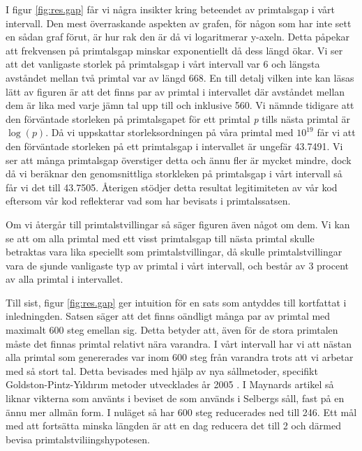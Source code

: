 I figur \ref{fig:res.gap} får vi några insikter kring beteendet av primtalsgap i vårt intervall. 
Den mest överraskande aspekten av grafen, för någon som har inte sett en sådan graf förut, är hur rak den är då vi logaritmerar y-axeln.
Detta påpekar att frekvensen på primtalsgap minskar exponentiellt då dess längd ökar. 
Vi ser att det vanligaste storlek på primtalsgap i vårt intervall var 6 och längsta avståndet mellan två primtal var av längd 668.
En till detalj vilken inte kan läsas lätt av figuren är att det finns par av primtal i intervallet där avståndet mellan dem är lika med varje jämn tal upp till och inklusive 560.
Vi nämnde tidigare att den förväntade storleken på primtalsgapet för ett primtal \textit{p} tills nästa primtal är \(\log(p)\). 
Då vi uppskattar storleksordningen på våra primtal med \(10^{19}\) får vi att den förväntade storleken på ett primtalsgap i intervallet är ungefär 43.7491.
Vi ser att många primtalsgap överstiger detta och ännu fler är mycket mindre, dock då vi beräknar den genomsnittliga storkleken på primtalsgap i vårt intervall så får vi det till 43.7505.
Återigen stödjer detta resultat legitimiteten av vår kod eftersom vår kod reflekterar vad som har bevisats i primtalssatsen.

Om vi återgår till primtalstvillingar så säger figuren även något om dem. 
Vi kan se att om alla primtal med ett visst primtalsgap till nästa primtal skulle betraktas vara lika speciellt som primtalstvillingar, då skulle primtalstvillingar vara de sjunde vanligaste typ av primtal i vårt intervall, och består av 3 procent av alla primtal i intervallet.

Till sist, figur \ref{fig:res.gap} ger intuition för en sats som antyddes till kortfattat i inledningden. 
Satsen säger att det finns oändligt många par av primtal med maximalt 600 steg emellan sig. 
Detta betyder att, även för de stora primtalen måste det finnas primtal relativt nära varandra.
I vårt intervall har vi att nästan alla primtal som genererades var inom 600 steg från varandra trots att vi arbetar med så stort tal.
Detta bevisades med hjälp av nya sållmetoder, specifikt Goldston-Pintz-Yıldırım metoder utvecklades år 2005 \cite{GPY}.
I Maynards artikel så liknar vikterna som använts i beviset de som används i Selbergs såll, fast på en ännu mer allmän form. 
I nuläget så har 600 steg reducerades ned till 246. 
Ett mål med att fortsätta minska längden är att en dag reducera det till 2 och därmed bevisa primtalstviliingshypotesen.

